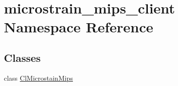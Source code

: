 \hypertarget{namespacemicrostrain__mips__client}{}\section{microstrain\+\_\+mips\+\_\+client Namespace Reference}
\label{namespacemicrostrain__mips__client}
\subsection*{Classes}
\begin{DoxyCompactItemize}
\item 
class \hyperlink{classmicrostrain__mips__client_1_1ClMicrostainMips}{Cl\+Microstain\+Mips}
\end{DoxyCompactItemize}
